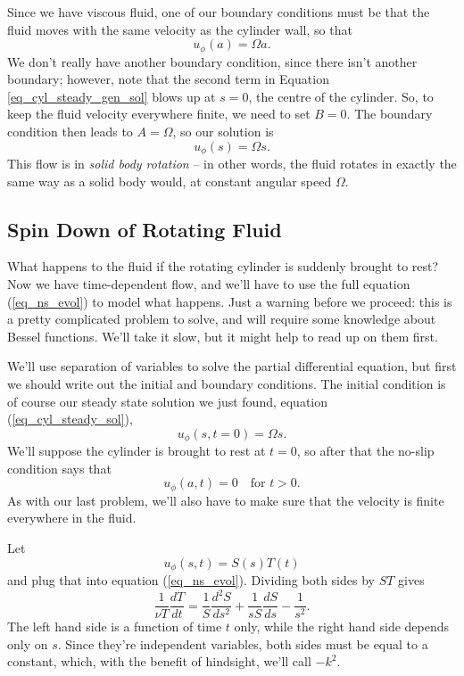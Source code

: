Since we have viscous fluid, one of our boundary conditions must be that the fluid moves with the same velocity as the cylinder wall, so that
\[
u_\phi(a) = \Omega a.
\]
We don't really have another boundary condition, since there isn't another boundary; however, note that the second term in Equation \ref{eq_cyl_steady_gen_sol} blows up at $s=0$, the centre of the cylinder.  So, to keep the fluid velocity everywhere finite, we need to set $B = 0$.  The boundary condition then leads to $A = \Omega$, so our solution is 
\begin{equation}
\label{eq_cyl_steady_sol}
u_\phi (s) = \Omega s.
\end{equation}
This flow is in \emph{solid body rotation} -- in other words, the fluid rotates in exactly the same way as a solid body would, at constant angular speed $\Omega$.



\subsection{Spin Down of Rotating Fluid}

What happens to the fluid if the rotating cylinder is suddenly brought to rest?  Now we have time-dependent flow, and we'll have to use the full equation (\ref{eq_ns_evol}) to model what happens.  Just a warning before we proceed:  this is a pretty complicated problem to solve, and will require some knowledge about Bessel functions.  We'll take it slow, but it might help to read up on them first.

We'll use separation of variables to solve the partial differential equation, but first we should write out the initial and boundary conditions.  The initial condition is of course our steady state solution we just found, equation (\ref{eq_cyl_steady_sol}),
\begin{equation}
\label{eq_spin_ic}
u_\phi (s, t=0) = \Omega s.
\end{equation}
We'll suppose the cylinder is brought to rest at $t=0$, so after that the no-slip condition says that
\begin{equation}
u_\phi(a, t) = 0 \quad \text{for } t > 0.
\end{equation}
As with our last problem, we'll also have to make sure that the velocity is finite everywhere in the fluid.

Let
\[
u_\phi(s, t) = S(s) T(t)
\]
and plug that into equation (\ref{eq_ns_evol}).  Dividing both sides by $ST$ gives
\[
\frac{1}{\nu T} \frac{dT}{dt} = \frac{1}{S} \frac{d^2S}{ds^2} + \frac{1}{sS} \frac{dS}{ds} - \frac{1}{s^2}.
\]
The left hand side is a function of time $t$ only, while the right hand side depends only on $s$.  Since they're independent variables, both sides must be equal to a constant, which, with the benefit of hindsight, we'll call $-k^2$.

